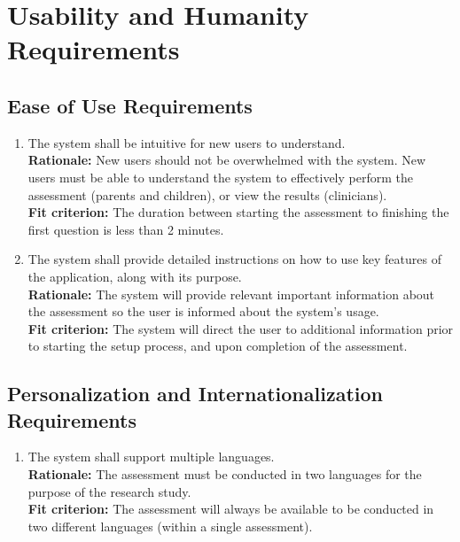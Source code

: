 \documentclass[12pt]{article}
\begin{document}
\section{Usability and Humanity Requirements}
\subsection{Ease of Use Requirements} 
\begin{enumerate}[{UH-EOU}1. ]
  \item The system shall be intuitive for new users to understand.\\
  \textbf{Rationale: }New users should not be overwhelmed with the system. New users must be able to understand the system to effectively perform the assessment (parents and children), or view the results (clinicians).\\
  \textbf{Fit criterion: }The duration between starting the assessment to finishing the first question is less than 2 minutes.
  \item The system shall provide detailed instructions on how to use key features of the application, along with its purpose.\\
  \textbf{Rationale: }The system will provide relevant important information about the assessment so the user is informed about the system's usage.\\ 
  \textbf{Fit criterion: }The system will direct the user to additional information prior to starting the setup process, and upon completion of the assessment.
\end{enumerate}
\subsection{Personalization and Internationalization Requirements}
\begin{enumerate}[{UH-PI}1. ]
  \item The system shall support multiple languages.\\
  \textbf{Rationale: }The assessment must be conducted in two languages for the purpose of the research study.\\
  \textbf{Fit criterion: }The assessment will always be available to be conducted in two different languages (within a single assessment).
\end{enumerate}
\end{document}
